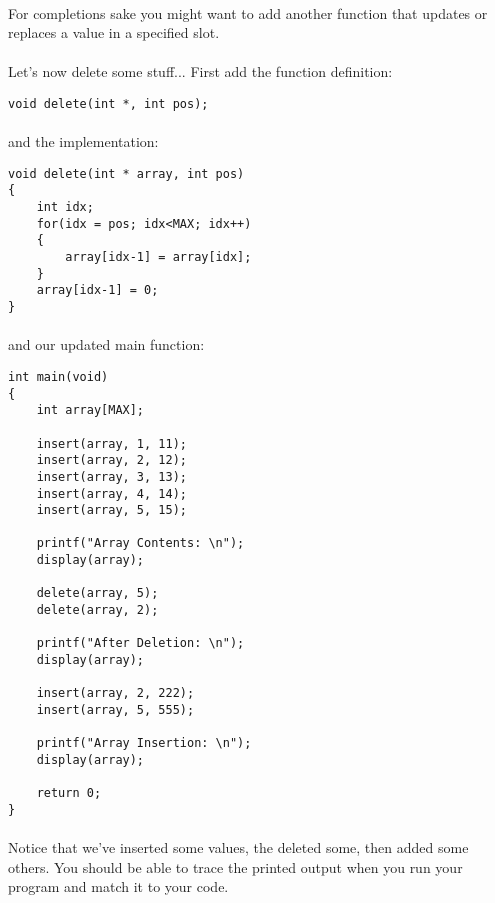 \documentclass[10pt, a4paper, twosize]{article}
\begin{document}
\paragraph{} For completions sake you might want to add another function that updates or replaces a value in a specified slot.

\paragraph{} Let's now delete some stuff... First add the function definition:

\begin{lstlisting}
void delete(int *, int pos);
\end{lstlisting}

\paragraph{} and the implementation:
\begin{lstlisting}
void delete(int * array, int pos)
{
    int idx;
    for(idx = pos; idx<MAX; idx++)
    {
        array[idx-1] = array[idx];
    }
    array[idx-1] = 0;
} 
\end{lstlisting}

\paragraph{} and our updated main function:

\begin{lstlisting}
int main(void)
{
    int array[MAX];

    insert(array, 1, 11);
    insert(array, 2, 12);
    insert(array, 3, 13);
    insert(array, 4, 14);
    insert(array, 5, 15);

    printf("Array Contents: \n");
    display(array);

    delete(array, 5);
    delete(array, 2);

    printf("After Deletion: \n");
    display(array);

    insert(array, 2, 222);
    insert(array, 5, 555);

    printf("Array Insertion: \n");
    display(array);

    return 0;
}
\end{lstlisting}

\paragraph{} Notice that we've inserted some values, the deleted some, then added some others. You should be able to trace the printed output when you run your program and match it to your code.
\end{document}
